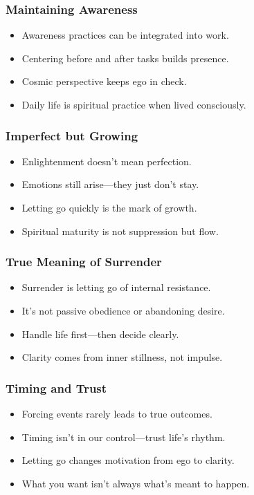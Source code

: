 \begin{frame}[fragile]\frametitle{Maintaining Awareness}
  \begin{itemize}
    \item Awareness practices can be integrated into work.
    \item Centering before and after tasks builds presence.
    \item Cosmic perspective keeps ego in check.
    \item Daily life is spiritual practice when lived consciously.
  \end{itemize}
\end{frame}

\begin{frame}[fragile]\frametitle{Imperfect but Growing}
  \begin{itemize}
    \item Enlightenment doesn’t mean perfection.
    \item Emotions still arise—they just don’t stay.
    \item Letting go quickly is the mark of growth.
    \item Spiritual maturity is not suppression but flow.
  \end{itemize}
\end{frame}

\begin{frame}[fragile]\frametitle{True Meaning of Surrender}
  \begin{itemize}
    \item Surrender is letting go of internal resistance.
    \item It's not passive obedience or abandoning desire.
    \item Handle life first—then decide clearly.
    \item Clarity comes from inner stillness, not impulse.
  \end{itemize}
\end{frame}

\begin{frame}[fragile]\frametitle{Timing and Trust}
  \begin{itemize}
    \item Forcing events rarely leads to true outcomes.
    \item Timing isn't in our control—trust life’s rhythm.
    \item Letting go changes motivation from ego to clarity.
    \item What you want isn’t always what’s meant to happen.
  \end{itemize}
\end{frame}


